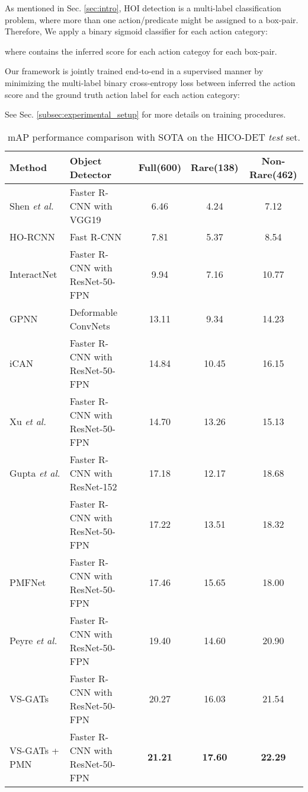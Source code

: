 \documentclass[10pt,twocolumn,letterpaper]{article}
\begin{document}
As mentioned in Sec. \ref{sec:intro}, HOI detection is a multi-label classification problem, where more than one action/predicate might be assigned to a  box-pair. Therefore, We apply a binary sigmoid classifier for each action category:

where  contains the inferred score for each action categoy for each  box-pair.

Our framework is jointly trained end-to-end in a supervised manner by minimizing the multi-label binary cross-entropy loss  between inferred the action score  and the ground truth action label  for each action category:  

See Sec. \ref{subsec:experimental_setup} for more details on training procedures.
\begin{table*}[tb]
\centering
    \begin{tabular}{llccc}
    \toprule
    Method           & Object Detector    & Full(600)   & Rare(138)   & Non-Rare(462)  \\
    \bottomrule
    Shen \textit{et al.} \cite{Shen2018ScalingLearning} & Faster R-CNN with VGG19\cite{Simonyan15_vgg}      & 6.46  & 4.24  & 7.12     \\
    HO-RCNN \cite{chao2018learning}                     & Fast R-CNN\cite{girshick2015fast} & 7.81  & 5.37  & 8.54   \\
    InteractNet \cite{gkioxari2018detecting}            & Faster R-CNN with ResNet-50-FPN   & 9.94  & 7.16  & 10.77  \\
    GPNN \cite{qi2018learning}                          & Deformable ConvNets \cite{Dai2017DeformableNetworks}              & 13.11 & 9.34  & 14.23    \\
    iCAN \cite{gao2018ican}                             & Faster R-CNN with ResNet-50-FPN   & 14.84 & 10.45 & 16.15  \\
    Xu \textit{et al.} \cite{xu2019learning}            & Faster R-CNN with ResNet-50-FPN   & 14.70 & 13.26 & 15.13  \\
Gupta \textit{et al.} \cite{gupta2018nofrills}      & Faster R-CNN with ResNet-152      & 17.18 & 12.17 & 18.68  \\
     \cite{Li_2019_CVPR}                    & Faster R-CNN with ResNet-50-FPN   & 17.22 & 13.51 & 18.32  \\
    PMFNet \cite{wan2019pose}                           & Faster R-CNN with ResNet-50-FPN   & 17.46 & 15.65 & 18.00  \\
    Peyre \textit{et al.} \cite{2019PeyreDetecting}     & Faster R-CNN with ResNet-50-FPN   & 19.40 & 14.60 & 20.90  \\
    \toprule
    VS-GATs \cite{liang2020visualsemantic}              & Faster R-CNN with ResNet-50-FPN   & 20.27 &16.03 & 21.54   \\
    VS-GATs + PMN  & Faster R-CNN with ResNet-50-FPN   & \textbf{21.21} & \textbf{17.60} & \textbf{22.29}  \\
    \bottomrule
    \end{tabular}
    \caption{mAP performance comparison with SOTA on the HICO-DET \textit{test} set.}
    \label{tbl:hico_mAP}
\end{table*}
\end{document}
